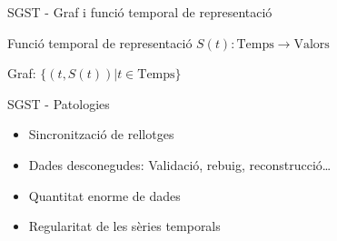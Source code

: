 \begin{frame}{SGST - Graf i funció temporal de representació}

Funció temporal de representació $S(t): \text{Temps} \longrightarrow \text{Valors}$

Graf: $\{(t,S(t)) | t \in \text{Temps}\}$


\end{frame}



\begin{frame}{SGST - Patologies}


  \begin{itemize}

    \item Sincronització de rellotges \parencite{kopetz11:realtime}
    \item Dades desconegudes: Validació, rebuig, reconstrucció\dots
    \item Quantitat enorme de dades
    \item Regularitat de les sèries temporals
  \end{itemize}
  

\end{frame}



